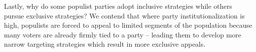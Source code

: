 \documentclass[a4paper,12pt]{article}\usepackage[]{graphicx}\usepackage[]{color}
\begin{document}
\par
Lastly, why do some populist parties adopt inclusive strategies while others pursue exclusive strategies? We contend that where party institutionalization is high, populists are forced to appeal to limited segments of the population because many voters are already firmly tied to a party -- leading them to develop more narrow targeting strategies which result in more exclusive appeals. 

\clearpage


\end{document}
